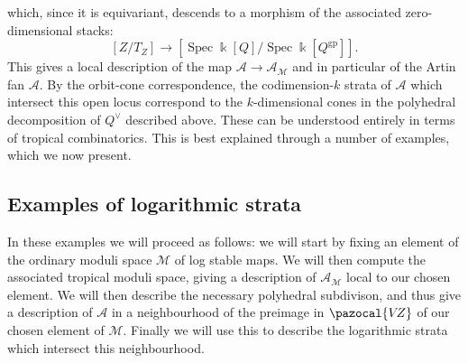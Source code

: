 \documentclass[11pt]{amsart}
\newcommand{\VZ}{\pazocal{V\!Z}}
\renewcommand{\to}{\rightarrow}
\newcommand{\kfield}{\Bbbk}
\newcommand{\Spec}{\operatorname{Spec}}
\newcommand{\Acal}{\mathcal{A}}
\newcommand{\Mcal}{\mathcal{M}}
\newcommand{\gp}{\operatorname{gp}}
\theoremstyle{definition}
\theoremstyle{definition}
\begin{document}
which, since it is equivariant, descends to a morphism of the associated zero-dimensional stacks:
\begin{equation*} \left[Z/T_Z \right] \to \left[ \Spec \kfield[Q] / \Spec\kfield [Q^{\gp}] \right]. \end{equation*}
This gives a local description of the map $\Acal \to \Acal_\Mcal$ and in particular of the Artin fan $\Acal$. By the orbit-cone correspondence, the codimension-$k$ strata of $\Acal$ which intersect this open locus correspond to the $k$-dimensional cones in the polyhedral decomposition of $Q^\vee$ described above. These can be understood entirely in terms of tropical combinatorics. This is best explained through a number of examples, which we now present.

\subsection{Examples of logarithmic strata} In these examples we will proceed as follows: we will start by fixing an element of the ordinary moduli space $\Mcal$ of log stable maps. We will then compute the associated tropical moduli space, giving a description of $\Acal_\Mcal$ local to our chosen element. We will then describe the necessary polyhedral subdivison, and thus give a description of $\Acal$ in a neighbourhood of the preimage in $\VZ$ of our chosen element of $\Mcal$. Finally we will use this to describe the logarithmic strata which intersect this neighbourhood.
\end{document}
